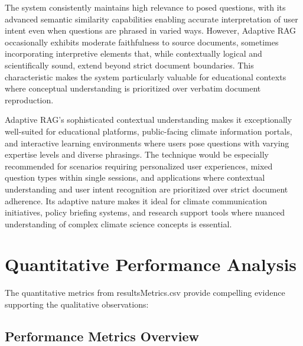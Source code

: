 \documentclass[12pt,a4paper]{article}
\begin{document}
The system consistently maintains high relevance to posed questions, with its advanced semantic similarity capabilities enabling accurate interpretation of user intent even when questions are phrased in varied ways. However, Adaptive RAG occasionally exhibits moderate faithfulness to source documents, sometimes incorporating interpretive elements that, while contextually logical and scientifically sound, extend beyond strict document boundaries. This characteristic makes the system particularly valuable for educational contexts where conceptual understanding is prioritized over verbatim document reproduction.

Adaptive RAG's sophisticated contextual understanding makes it exceptionally well-suited for educational platforms, public-facing climate information portals, and interactive learning environments where users pose questions with varying expertise levels and diverse phrasings. The technique would be especially recommended for scenarios requiring personalized user experiences, mixed question types within single sessions, and applications where contextual understanding and user intent recognition are prioritized over strict document adherence. Its adaptive nature makes it ideal for climate communication initiatives, policy briefing systems, and research support tools where nuanced understanding of complex climate science concepts is essential.

\section{Quantitative Performance Analysis}

The quantitative metrics from resultsMetrics.csv provide compelling evidence supporting the qualitative observations:

\subsection{Performance Metrics Overview}
\end{document}
